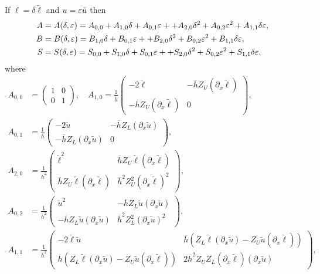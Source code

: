 If $\ell=\delta\tilde{\ell}$ and $u=\varepsilon\tilde{u}$ then
\begin{align*}
A&=A(\delta,\varepsilon)=A_{0,0}+A_{1,0}\delta +A_{0,1}\varepsilon + 
+A_{2,0}\delta^2 + A_{0,2}\varepsilon^2 + A_{1,1}\delta\varepsilon,\\
B&=B(\delta,\varepsilon)=B_{1,0}\delta +B_{0,1}\varepsilon + 
+B_{2,0}\delta^2 + B_{0,2}\varepsilon^2 + B_{1,1}\delta\varepsilon,\\
S&=S(\delta,\varepsilon)=S_{0,0}+S_{1,0}\delta +S_{0,1}\varepsilon + 
+S_{2,0}\delta^2 + S_{0,2}\varepsilon^2 + S_{1,1}\delta\varepsilon,
\end{align*}
where
\begin{align*}
A_{0,0}&=\begin{pmatrix}
    1 & 0\\
    0 & 1
  \end{pmatrix},\quad
A_{1,0}=\frac{1}{\overline{h}}
  \begin{pmatrix}
    -2\tilde{\ell} & -\overline{h}Z_U(\partial_x \tilde{\ell})\\
    -\overline{h}Z_U(\partial_x \tilde{\ell}) & 0
  \end{pmatrix},\\
A_{0,1}&=\frac{1}{\overline{h}}
  \begin{pmatrix}
    -2\tilde{u} & -\overline{h}Z_L(\partial_x \tilde{u})\\
    -\overline{h}Z_L(\partial_x \tilde{u}) & 0
  \end{pmatrix},\\
A_{2,0}&=\frac{1}{\overline{h}^2}
  \begin{pmatrix}
    \tilde{\ell}^2 & \overline{h}Z_U\tilde{\ell}(\partial_x \tilde{\ell})\\
    \overline{h}Z_U\tilde{\ell}(\partial_x \tilde{\ell}) & \overline{h}^2 Z_U^2(\partial_x \tilde{\ell})^2
  \end{pmatrix},\\
A_{0,2}&=\frac{1}{\overline{h}^2}
  \begin{pmatrix}
    \tilde{u}^2 & -\overline{h}Z_L\tilde{u}(\partial_x \tilde{u})\\
    -\overline{h}Z_L\tilde{u}(\partial_x \tilde{u}) & \overline{h}^2 Z_L^2(\partial_x \tilde{u})^2
  \end{pmatrix},\\
A_{1,1}&=\frac{1}{\overline{h}^2}
  \begin{pmatrix}
    -2\tilde{\ell}\tilde{u} & \overline{h}\left(Z_L\tilde{\ell}(\partial_x \tilde{u})-Z_U\tilde{u}(\partial_x \tilde{\ell})\right)\\
    \overline{h}\left(Z_L\tilde{\ell}(\partial_x \tilde{u})-Z_U\tilde{u}(\partial_x \tilde{\ell})\right) & 2\overline{h}^2 Z_U Z_L(\partial_x \tilde{\ell})(\partial_x \tilde{u})
  \end{pmatrix},
\end{align*}
